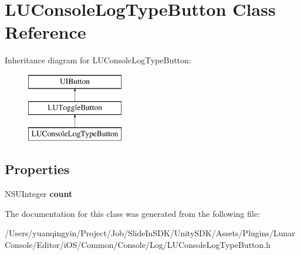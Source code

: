 \hypertarget{interface_l_u_console_log_type_button}{}\section{L\+U\+Console\+Log\+Type\+Button Class Reference}
\label{interface_l_u_console_log_type_button}
Inheritance diagram for L\+U\+Console\+Log\+Type\+Button\+:\begin{figure}[H]
\begin{center}
\leavevmode
\includegraphics[height=3.000000cm]{interface_l_u_console_log_type_button}
\end{center}
\end{figure}
\subsection*{Properties}
\begin{DoxyCompactItemize}
\item 
\mbox{\label{interface_l_u_console_log_type_button_adb77ed3b969fcc2b616777a3738307c0}} 
N\+S\+U\+Integer {\bfseries count}
\end{DoxyCompactItemize}


The documentation for this class was generated from the following file\+:\begin{DoxyCompactItemize}
\item 
/\+Users/yuanqingyin/\+Project/\+Job/\+Slide\+In\+S\+D\+K/\+Unity\+S\+D\+K/\+Assets/\+Plugins/\+Lunar\+Console/\+Editor/i\+O\+S/\+Common/\+Console/\+Log/L\+U\+Console\+Log\+Type\+Button.\+h\end{DoxyCompactItemize}
